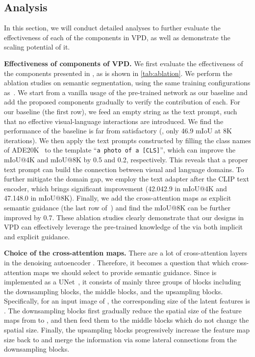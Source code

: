 \documentclass[10pt,twocolumn,letterpaper]{article}
\newcommand{\epstheta}{}
\newcommand{\paragrapha}[2][4pt]{\vspace{#1}\noindent\textbf{#2}}
\begin{document}
\subsection{Analysis}
In this section, we will conduct detailed analyses to further evaluate the effectiveness of each of the components in VPD, as well as demonstrate the scaling potential of it.

\paragrapha{Effectiveness of components of VPD.} We first evaluate the effectiveness of the components presented in , as is shown in \cref{tab:ablation}. We perform the ablation studies on semantic segmentation, using the same training configurations as~. We start from a vanilla usage of the pre-trained \epstheta{} network as our baseline and add the proposed components gradually to verify the contribution of each. For our baseline (the first row), we feed an empty string as the text prompt, such that no effective visual-language interactions are introduced. We find the performance of the baseline is far from satisfactory (\eg, only 46.9 mIoU at 8K iterations). We then apply the text prompts constructed by filling the class names of ADE20K~\cite{zhou2017ade} to the template ``\texttt{a photo of a [CLS]}'', which can improve the mIoU@4K and mIoU@8K by 0.5 and 0.2, respectively. This reveals that a proper text prompt can build the connection between visual and language domains. To further mitigate the domain gap, we employ the text adapter after the CLIP text encoder, which brings significant improvement (42.042.9 in mIoU@4K and 47.148.0 in mIoU@8K). Finally, we add the cross-attention maps as explicit semantic guidance (the last row of~) and find the mIoU@8K can be further improved by 0.7. These ablation studies clearly demonstrate that our designs in VPD can effectively leverage the pre-trained knowledge of the \epstheta{} via both implicit and explicit guidance.



\paragrapha{Choice of the cross-attention maps.} There are a lot of cross-attention layers in the denoising autoencoder \epstheta{}. Therefore, it becomes a question that which cross-attention maps we should select to provide semantic guidance. Since \epstheta{} is implemented as a UNet~\cite{ronneberger2015unet}, it consists of mainly three groups of blocks including the downsampling blocks, the middle blocks, and the upsampling blocks. Specifically, for an input image of , the corresponding size of the latent features is . The downsampling blocks first gradually reduce the spatial size of the feature maps from  to , and then feed them to the middle blocks which do not change the spatial size. Finally, the upsampling blocks progressively increase the feature map size back to  and merge the information via some lateral connections from the downsampling blocks. 
\end{document}
